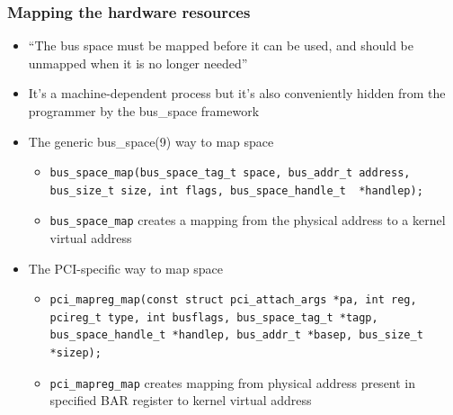 \documentclass[dvipsnames,table]{beamer}
\begin{document}
\begin{frame}[fragile]
\frametitle{Mapping the hardware resources}

\begin{itemize}
	\item ``The bus space must be mapped before it can be used, and should be unmapped       when it is no longer needed''
\normalsize
	\item It's a machine-dependent process but it's also conveniently hidden from the programmer by the bus\_space framework
	\item The generic bus\_space(9) way to map space
\begin{itemize}
	\scriptsize
	\item
\begin{verbatim}
bus_space_map(bus_space_tag_t space, bus_addr_t address, 
bus_size_t size, int flags, bus_space_handle_t  *handlep);
\end{verbatim}
	\normalsize
	\item {\tt bus\_space\_map} creates a mapping from the physical address to a kernel virtual address
\end{itemize}

	\item The PCI-specific way to map space
\begin{itemize}
	\scriptsize
	\item
\begin{verbatim}
pci_mapreg_map(const struct pci_attach_args *pa, int reg, 
pcireg_t type, int busflags, bus_space_tag_t *tagp, 
bus_space_handle_t *handlep, bus_addr_t *basep, bus_size_t *sizep);
\end{verbatim}

	\normalsize
	\item {\tt pci\_mapreg\_map} creates mapping from physical address present in specified BAR register to kernel virtual address
\end{itemize}
\end{itemize}
\end{frame}
\end{document}
